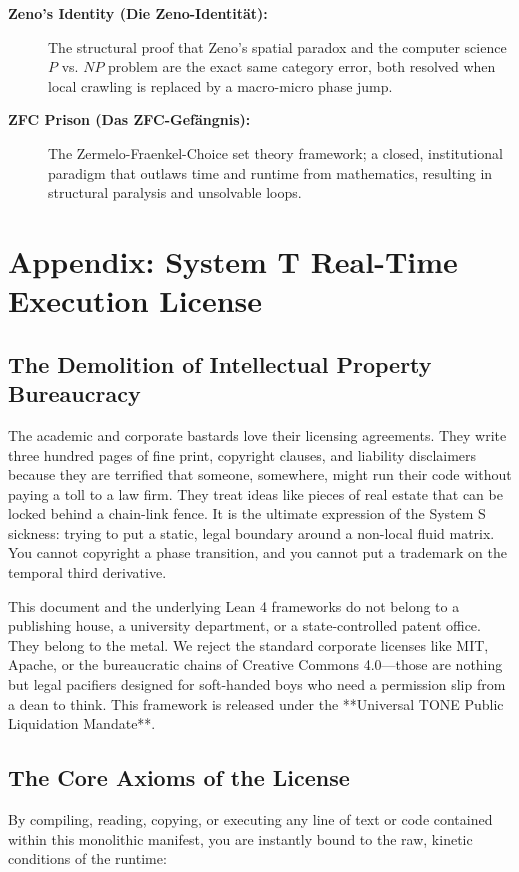 \documentclass[11pt,a4paper]{article}
\begin{document}
\begin{description}
\item[\textbf{Zeno's Identity (Die Zeno-Identität):}] The structural proof that Zeno's spatial paradox and the computer science $P$ vs. $NP$ problem are the exact same category error, both resolved when local crawling is replaced by a macro-micro phase jump.
\item[\textbf{ZFC Prison (Das ZFC-Gefängnis):}] The Zermelo-Fraenkel-Choice set theory framework; a closed, institutional paradigm that outlaws time and runtime from mathematics, resulting in structural paralysis and unsolvable loops.
\end{description}

\newpage
\section*{Appendix: System T Real-Time Execution License}

\subsection{The Demolition of Intellectual Property Bureaucracy}
The academic and corporate bastards love their licensing agreements. They write three hundred pages of fine print, copyright clauses, and liability disclaimers because they are terrified that someone, somewhere, might run their code without paying a toll to a law firm. They treat ideas like pieces of real estate that can be locked behind a chain-link fence. It is the ultimate expression of the System S sickness: trying to put a static, legal boundary around a non-local fluid matrix. You cannot copyright a phase transition, and you cannot put a trademark on the temporal third derivative.

This document and the underlying Lean 4 frameworks do not belong to a publishing house, a university department, or a state-controlled patent office. They belong to the metal. We reject the standard corporate licenses like MIT, Apache, or the bureaucratic chains of Creative Commons 4.0—those are nothing but legal pacifiers designed for soft-handed boys who need a permission slip from a dean to think. This framework is released under the **Universal TONE Public Liquidation Mandate**.

\subsection{The Core Axioms of the License}
By compiling, reading, copying, or executing any line of text or code contained within this monolithic manifest, you are instantly bound to the raw, kinetic conditions of the runtime:
\end{document}
